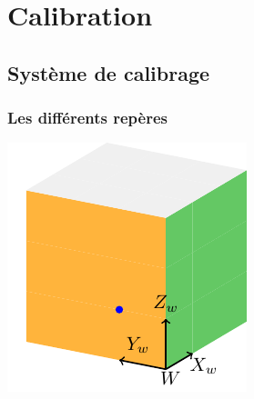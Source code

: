 \section[Calibration]{Calibration}
\subsection{Système de calibrage}

\begin{frame}
\frametitle{Les différents repères}

\begin{minipage}{0.48\textwidth}
    \centering
    \includegraphics[width=\linewidth]{capture/cube_tikz.pdf}
    \vspace{0.5em}
    

\end{minipage}
\end{frame}
